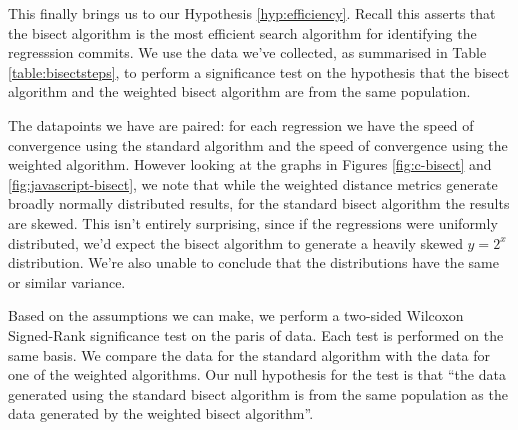 \documentclass[pdflatex, sn-mathphys, referee]{sn-jnl}%
\theoremstyle{thmstyleone}%
\theoremstyle{thmstyletwo}%
\theoremstyle{thmstylethree}%
\theoremstyle{thmstyleone}
\begin{document}
This finally brings us to our Hypothesis \ref{hyp:efficiency}. Recall this asserts that the bisect algorithm is the most efficient search algorithm for identifying the regresssion commits. We use the data we've collected, as summarised in Table \ref{table:bisectsteps}, to perform a significance test on the hypothesis that the bisect algorithm and the weighted bisect algorithm are from the same population.

The datapoints we have are paired: for each regression we have the speed of convergence using the standard algorithm and the speed of convergence using the weighted algorithm. However looking at the graphs in Figures \ref{fig:c-bisect} and \ref{fig:javascript-bisect}, we note that while the weighted distance metrics generate broadly normally distributed results, for the standard bisect algorithm the results are skewed. This isn't entirely surprising, since if the regressions were uniformly distributed, we'd expect the bisect algorithm to generate a heavily skewed $y = 2^x$ distribution. We're also unable to conclude that the distributions have the same or similar variance.

Based on the assumptions we can make, we perform a two-sided Wilcoxon Signed-Rank significance test on the paris of data. Each test is performed on the same basis. We compare the data for the standard algorithm with the data for one of the weighted algorithms. Our null hypothesis for the test is that ``the data generated using the standard bisect algorithm is from the same population as the data generated by the weighted bisect algorithm''.
\end{document}

